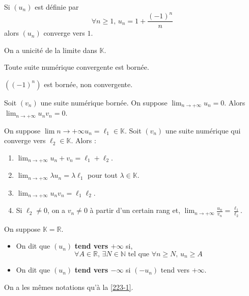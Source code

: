   \begin{example}
    Si $(u_n)$ est définie par
    \[ \forall n \geq 1, \, u_n = 1 + \frac{(-1)^n}{n} \]
    alors $(u_n)$ converge vers $1$.
  \end{example}

  \begin{theorem}
    On a unicité de la limite dans $\mathbb{K}$.
  \end{theorem}

  \begin{proposition}
    Toute suite numérique convergente est bornée.
  \end{proposition}

  \begin{cexample}
    $((-1)^n)$ est bornée, non convergente.
  \end{cexample}

  \begin{proposition}
    Soit $(v_n)$ une suite numérique bornée. On suppose $\lim_{n \rightarrow +\infty} u_n = 0$. Alors $\lim_{n \rightarrow +\infty} u_n v_n = 0$.
  \end{proposition}

  \begin{proposition}
    On suppose $\lim{n \rightarrow +\infty} u_n = \ell_1 \in \mathbb{K}$. Soit $(v_n)$ une suite numérique qui converge vers $\ell_2 \in \mathbb{K}$. Alors :
    \begin{enumerate}[label=(\roman*)]
      \item $\lim_{n \rightarrow +\infty} u_n + v_n = \ell_1 + \ell_2$.
      \item $\lim_{n \rightarrow +\infty} \lambda u_n = \lambda \ell_1$ pour tout $\lambda \in \mathbb{K}$.
      \item $\lim_{n \rightarrow +\infty} u_n v_n = \ell_1 \ell_2$.
      \item Si $\ell_2 \neq 0$, on a $v_n \neq 0$ à partir d'un certain rang et, $\lim_{n \rightarrow +\infty} \frac{u_n}{v_n} = \frac{\ell_1}{\ell_2}$.
    \end{enumerate}
  \end{proposition}


  \begin{definition}
    On suppose $\mathbb{K} = \mathbb{R}$.
    \begin{itemize}
      \item On dit que $(u_n)$ \textbf{tend vers $+\infty$} si,
      \[ \forall A \in \mathbb{R}, \, \exists N \in \mathbb{N} \text{ tel que } \forall n \geq N, \, u_n \geq A \]
      \item On dit que $(u_n)$ \textbf{tend vers $-\infty$} si $(-u_n)$ tend vers $+\infty$.
    \end{itemize}
    On a les mêmes notations qu'à la \cref{223-1}.
  \end{definition}

